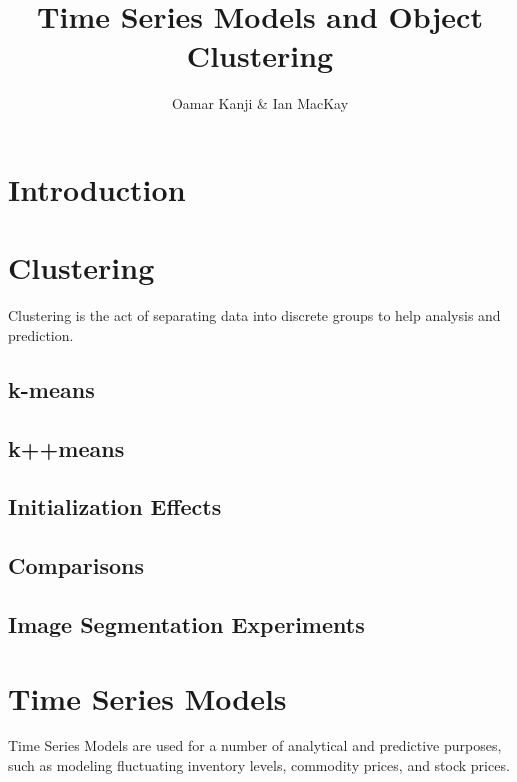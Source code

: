 \documentclass[12pt]{article}
\begin{document}
\title{\vspace{-1.5in} Time Series Models and Object Clustering}
\author{Oamar Kanji \& Ian MacKay}
\maketitle

\tableofcontents

\section{Introduction}
  \begin{center}

  \end{center}

\pagebreak

\section{Clustering}
  Clustering is the act of separating data into discrete groups to help analysis and prediction.
\subsection{k-means}
\subsection{k++means}
\subsection{Initialization Effects}
\subsection{Comparisons}
\subsection{Image Segmentation Experiments}

\pagebreak

\section{Time Series Models}
  Time Series Models are used for a number of analytical and predictive purposes, such as modeling fluctuating inventory levels, commodity prices, and stock prices.
\end{document}
